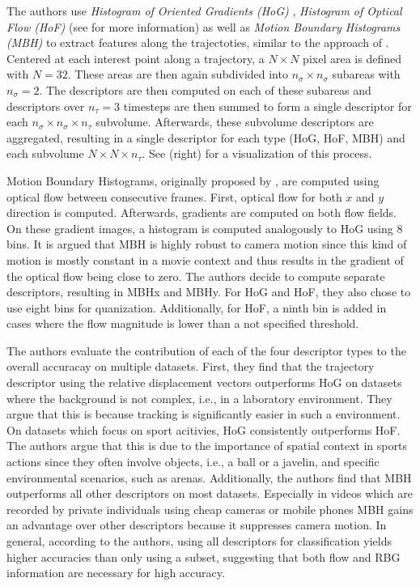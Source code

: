 The authors use \textit{Histogram of Oriented Gradients (HoG)} \cite{dalal_histograms_2005}, \textit{Histogram of Optical Flow (HoF)} \cite{laptev_learning_2008} (see  for more information) as well as \textit{Motion Boundary Histograms (MBH)} \cite{dalal_human_2006} to extract features along the trajectoties, similar to the approach of \cite{laptev_learning_2008} .
Centered at each interest point along a trajectory, a $N \times N$ pixel area is defined with $N = 32$.
These areas are then again subdivided into $n_\sigma \times n_\sigma$ subareas with $n_\sigma = 2$.
The descriptors are then computed on each of these subareas and descriptors over $n_\tau = 3$ timesteps are then summed to form a single descriptor for each $n_\sigma \times n_\sigma \times n_\tau$ subvolume.
Afterwards, these subvolume descriptors are aggregated, resulting in a single descriptor for each type (HoG, HoF, MBH) and each subvolume $N \times N \times n_\tau$.
See  (right) for a visualization of this process.

Motion Boundary Histograms, originally proposed by \cite{dalal_human_2006}, are computed using optical flow between consecutive frames.
First, optical flow for both $x$ and $y$ direction is computed.
Afterwards, gradients are computed on both flow fields.
On these gradient images, a histogram is computed analogously to HoG using 8 bins.
It is argued that MBH is highly robust to camera motion since this kind of motion is mostly constant in a movie context and thus results in the gradient of the optical flow being close to zero. 
The authors decide to compute separate descriptors, resulting in MBHx and MBHy.
For HoG and HoF, they also chose to use eight bins for quanization.
Additionally, for HoF, a ninth bin is added in cases where the flow magnitude is lower than a not specified threshold.

The authors evaluate the contribution of each of the four descriptor types to the overall accuracay on multiple datasets.
First, they find that the trajectory descriptor using the relative displacement vectors outperforms HoG on datasets where the background is not complex, i.e., in a laboratory environment.
They argue that this is because tracking is significantly easier in such a environment.
On datasets which focus on sport acitivies, HoG consistently outperforms HoF.
The authors argue that this is due to the importance of spatial context in sports actions since they often involve objects, i.e., a ball or a javelin, and specific environmental scenarios, such as arenas.
Additionally, the authors find that MBH outperforms all other descriptors on most datasets.
Especially in videos which are recorded by private individuals using cheap cameras or mobile phones MBH gains an advantage over other descriptors because it suppresses camera motion.
In general, according to the authors, using all descriptors for classification yields higher accuracies than only using a subset, suggesting that both flow and RBG information are necessary for high accuracy.

